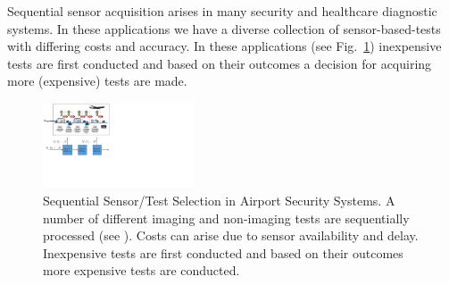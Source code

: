 Sequential sensor acquisition arises in many security and healthcare diagnostic systems. In these applications we have a diverse collection of sensor-based-tests with differing costs and accuracy. %
In these applications (see Fig.~\ref{motiv}) inexpensive tests are first conducted and based on their outcomes a decision for acquiring more (expensive) tests are made. %
\begin{figure}[t]
  \centering
  \includegraphics[width=0.4\textwidth]{../figures/motiv.pdf}
  \caption{\footnotesize Sequential Sensor/Test Selection in Airport Security Systems. A number of different imaging and non-imaging tests are sequentially processed (see \cite{ML13_MultistageClassifier_TrapezSaligramaCastanon}). Costs can arise due to sensor availability and delay. Inexpensive tests are first conducted and based on their outcomes more expensive tests are conducted.}
  \label{motiv}
\vspace{-20pt}
\end{figure}
